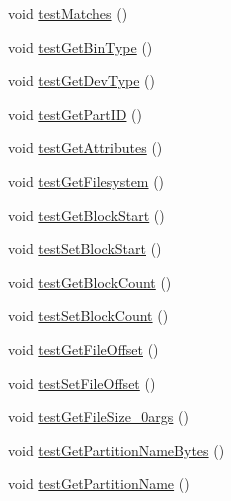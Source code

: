 \begin{DoxyCompactItemize}
\item 
void \hyperlink{classCASUAL_1_1archiving_1_1libpit_1_1PitEntryTest_ab5e344028098b63a416ee4190cb56b12}{test\-Matches} ()
\item 
void \hyperlink{classCASUAL_1_1archiving_1_1libpit_1_1PitEntryTest_a7d2be9f55ffd2fced394d7887bb898a5}{test\-Get\-Bin\-Type} ()
\item 
void \hyperlink{classCASUAL_1_1archiving_1_1libpit_1_1PitEntryTest_ab4411fb6e106a5fe0e7e59f82b1c368f}{test\-Get\-Dev\-Type} ()
\item 
void \hyperlink{classCASUAL_1_1archiving_1_1libpit_1_1PitEntryTest_a6a0b1f5e02bea82e46132f55c0c2c64f}{test\-Get\-Part\-I\-D} ()
\item 
void \hyperlink{classCASUAL_1_1archiving_1_1libpit_1_1PitEntryTest_a04d85e4ce7961e30770d9e3182be1dbb}{test\-Get\-Attributes} ()
\item 
void \hyperlink{classCASUAL_1_1archiving_1_1libpit_1_1PitEntryTest_af2b68a8e0381598e33ecde1a55adbd52}{test\-Get\-Filesystem} ()
\item 
void \hyperlink{classCASUAL_1_1archiving_1_1libpit_1_1PitEntryTest_a699b6584b6da8b1f870503c62d4d2028}{test\-Get\-Block\-Start} ()
\item 
void \hyperlink{classCASUAL_1_1archiving_1_1libpit_1_1PitEntryTest_abe6d7ef846f873447a48f0aec12ad52b}{test\-Set\-Block\-Start} ()
\item 
void \hyperlink{classCASUAL_1_1archiving_1_1libpit_1_1PitEntryTest_aafe49e1d9dcff3a1f9b0fcb9fc40600f}{test\-Get\-Block\-Count} ()
\item 
void \hyperlink{classCASUAL_1_1archiving_1_1libpit_1_1PitEntryTest_a92506f499e25001923a5943b937138c1}{test\-Set\-Block\-Count} ()
\item 
void \hyperlink{classCASUAL_1_1archiving_1_1libpit_1_1PitEntryTest_a99f2303ffe21405112a6a0189858ce24}{test\-Get\-File\-Offset} ()
\item 
void \hyperlink{classCASUAL_1_1archiving_1_1libpit_1_1PitEntryTest_a0b4c156a55f261660151eb2574c1b6e3}{test\-Set\-File\-Offset} ()
\item 
void \hyperlink{classCASUAL_1_1archiving_1_1libpit_1_1PitEntryTest_a23d094eb684ad446e43f8fc481094e0f}{test\-Get\-File\-Size\-\_\-0args} ()
\item 
void \hyperlink{classCASUAL_1_1archiving_1_1libpit_1_1PitEntryTest_ad65cfab0db84145d602e044ebe70c38d}{test\-Get\-Partition\-Name\-Bytes} ()
\item 
void \hyperlink{classCASUAL_1_1archiving_1_1libpit_1_1PitEntryTest_a41a892fac2e3830201c8ee8742328dd6}{test\-Get\-Partition\-Name} ()

\end{DoxyCompactItemize}
